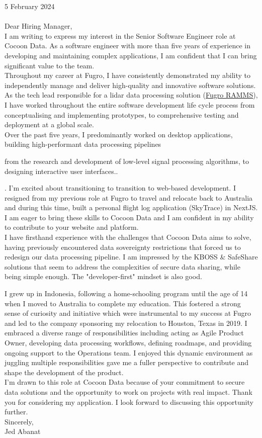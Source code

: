 \documentclass[10pt,letterpaper]{article}
\begin{document}


\vspace{30pt}

5 February 2024 \\ \\

Dear Hiring Manager, \\

I am writing to express my interest in the Senior Software Engineer role at Cocoon Data. As a software engineer with more than five years of experience in developing and maintaining complex applications, I am confident that I can bring significant value to the team. \\

Throughout my career at Fugro, I have consistently demonstrated my ability to independently manage and deliver high-quality and innovative software solutions. As the tech lead responsible for a lidar data processing solution (\href{https://www.youtube.com/watch?v=f65bdm4tous}{\underline{Fugro RAMMS}}), I have worked throughout the entire software development life cycle process from conceptualising and implementing prototypes, to comprehensive testing and deployment at a global scale. \\

Over the past five years, I predominantly worked on desktop applications, building high-performant data processing pipelines

from the research and development of low-level signal processing algorithms, to designing interactive user interfaces.. 


. I'm excited about transitioning to transition to web-based development. I resigned from my previous role at Fugro to travel and relocate back to Australia and during this time, built a personal flight log application (SkyTrace) in NextJS. I am eager to bring these skills to Cocoon Data and I am confident in my ability to contribute to your website and platform. \\

I have firsthand experience with the challenges that Cocoon Data aims to solve, having previously encountered data sovereignty restrictions that forced us to redesign our data processing pipeline. I am impressed by the KBOSS \& SafeShare solutions that seem to address the complexities of secure data sharing, while being simple enough. The "developer-first" mindset is also good.

I grew up in Indonesia, following a home-schooling program until the age of 14 when I moved to Australia to complete my education. This fostered a strong sense of curiosity and initiative which were instrumental to my success at Fugro and led to the company sponsoring my relocation to Houston, Texas in 2019. I embraced a diverse range of responsibilities including acting as Agile Product Owner, developing data processing workflows, defining roadmaps, and providing ongoing support to the Operations team. I enjoyed this dynamic environment as juggling multiple responsibilities gave me a fuller perspective to contribute and shape the development of the product. \\

I’m drawn to this role at Cocoon Data because of your commitment to secure data solutions and the opportunity to work on projects with real impact. Thank you for considering my application. I look forward to discussing this opportunity further. \\

Sincerely,\\
Jed Abanat
\end{document}
